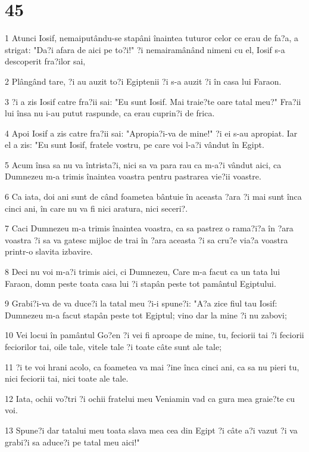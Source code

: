\chapter{45}

\par 1 Atunci Iosif, nemaiputându-se stapâni înaintea tuturor celor ce erau de fa?a, a strigat: "Da?i afara de aici pe to?i!" ?i nemairamânând nimeni cu el, Iosif s-a descoperit fra?ilor sai,
\par 2 Plângând tare, ?i au auzit to?i Egiptenii ?i s-a auzit ?i în casa lui Faraon.
\par 3 ?i a zis Iosif catre fra?ii sai: "Eu sunt Iosif. Mai traie?te oare tatal meu?" Fra?ii lui însa nu i-au putut raspunde, ca erau cuprin?i de frica.
\par 4 Apoi Iosif a zis catre fra?ii sai: "Apropia?i-va de mine!" ?i ei s-au apropiat. Iar el a zis: "Eu sunt Iosif, fratele vostru, pe care voi l-a?i vândut în Egipt.
\par 5 Acum însa sa nu va întrista?i, nici sa va para rau ca m-a?i vândut aici, ca Dumnezeu m-a trimis înaintea voastra pentru pastrarea vie?ii voastre.
\par 6 Ca iata, doi ani sunt de când foametea bântuie în aceasta ?ara ?i mai sunt înca cinci ani, în care nu va fi nici aratura, nici seceri?.
\par 7 Caci Dumnezeu m-a trimis înaintea voastra, ca sa pastrez o rama?i?a în ?ara voastra ?i sa va gatesc mijloc de trai în ?ara aceasta ?i sa cru?e via?a voastra printr-o slavita izbavire.
\par 8 Deci nu voi m-a?i trimis aici, ci Dumnezeu, Care m-a facut ca un tata lui Faraon, domn peste toata casa lui ?i stapân peste tot pamântul Egiptului.
\par 9 Grabi?i-va de va duce?i la tatal meu ?i-i spune?i: "A?a zice fiul tau Iosif: Dumnezeu m-a facut stapân peste tot Egiptul; vino dar la mine ?i nu zabovi;
\par 10 Vei locui în pamântul Go?en ?i vei fi aproape de mine, tu, feciorii tai ?i feciorii feciorilor tai, oile tale, vitele tale ?i toate câte sunt ale tale;
\par 11 ?i te voi hrani acolo, ca foametea va mai ?ine înca cinci ani, ca sa nu pieri tu, nici feciorii tai, nici toate ale tale.
\par 12 Iata, ochii vo?tri ?i ochii fratelui meu Veniamin vad ca gura mea graie?te cu voi.
\par 13 Spune?i dar tatalui meu toata slava mea cea din Egipt ?i câte a?i vazut ?i va grabi?i sa aduce?i pe tatal meu aici!"
